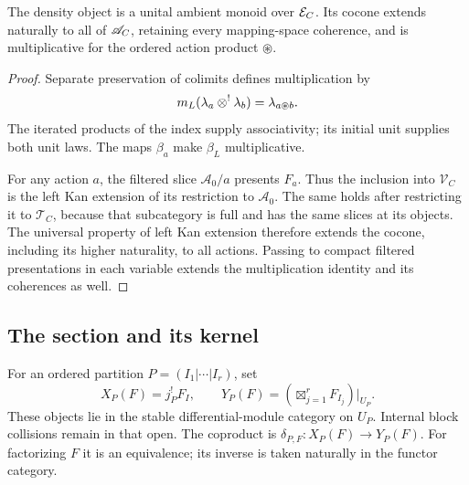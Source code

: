 \begin{proposition}\label{prop:vol2-density-cocone}
The density object is a unital ambient monoid over $\mathcal E_C$.
Its cocone extends naturally to all of $\mathscr A_C$, retaining
every mapping-space coherence, and is multiplicative for
the ordered action product $\circledast$.
\end{proposition}
\begin{proof}
Separate preservation of colimits defines multiplication by
\[
 m_L(\lambda_a\mathbin{\otimes^!}\lambda_b)=\lambda_{a\circledast b}.
\]
The iterated products of the index supply associativity;
its initial unit supplies both unit laws. The maps $\beta_a$
make $\beta_L$ multiplicative.

For any action $a$, the filtered slice $\mathscr A_0/a$
presents $F_a$. Thus the inclusion into $\mathscr V_C$
is the left Kan extension of its restriction to
$\mathscr A_0$. The same holds after restricting it to
$\mathscr T_C$, because that subcategory is full and
has the same slices at its objects. The universal property
of left Kan extension therefore extends the cocone,
including its higher naturality, to all actions. Passing
to compact filtered presentations in each variable extends
the multiplication identity and its coherences as well.
\end{proof}

\subsection{The section and its kernel}

For an ordered partition $P=(I_1|\cdots|I_r)$, set
\[
 X_P(F)=j_P^!F_I,\qquad
 Y_P(F)=\left(\boxtimes_{j=1}^rF_{I_j}\right)|_{U_P}.
\]
These objects lie in the stable differential-module category
on $U_P$. Internal block collisions remain in that open.
The coproduct is $\delta_{P,F}:X_P(F)\to Y_P(F)$.
For factorizing $F$ it is an equivalence; its inverse is
taken naturally in the functor category.

